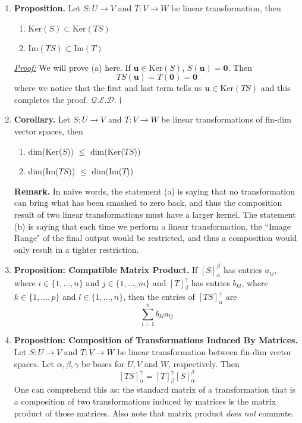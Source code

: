 \documentclass[oneside, 12pt]{book}
\newcommand{\settag}[1]{\renewcommand{\theenumi}{#1}}
\newcommand{\qed}{\hfill $\mathcal{Q}.\mathcal{E}.\mathcal{D}.\dagger$}
\newcommand{\tbf}[1]{\textbf{#1}}
\newcommand{\tit}[1]{\textit{#1}}
\newcommand{\proof}{\tit{\underline{Proof:}}} %
\newcommand{\trans}[3]{$#1:#2\rightarrow{}#3$}
\newcommand{\para}[1]{\item \tbf{#1}}
\newcommand{\vu}{\mathbf{u}}
\begin{document}
\begin{enumerate}
    \settag{2.5.6}
    \para{Proposition.} Let \trans{S}{U}{V} and \trans{T}{V}{W} be linear transformation, then
    \begin{enumerate}
        \item $\text{Ker}(S)\subset \text{Ker}(TS)$
        \item $\text{Im}(TS)\subset \text{Im}(T)$
    \end{enumerate}
    \proof \newline
    We will prove (a) here. If $\vu \in \text{Ker}(S)$, $S(\vu) = \mathbf{0}$. Then 
    \begin{equation*}
        TS(\vu) = T(\mathbf{0}) = \mathbf{0}
    \end{equation*}
    where we notice that the first and last term tells us $\vu \in \text{Ker}(TS)$ and this completes the proof. \qed
    
    \settag{2.5.7}
    \para{Corollary.} Let \trans{S}{U}{V} and \trans{T}{V}{W} be linear transformations of fin-dim vector spaces, then
    \begin{enumerate}
        \item dim(Ker($S$)) $\leq$ dim(Ker($TS$))
        \item dim(Im($TS$)) $\leq$ dim(Im($T$))
    \end{enumerate}
    \tbf{Remark.} In naive words, the statement (a) is saying that no transformation can bring what has been smashed to zero back, and thus the composition result of two linear transformations must have a larger kernel. The statement (b) is saying that each time we perform a linear transformation, the ``Image Range" of the final output would be restricted, and thus a composition would only result in a tighter restriction.
    
    \settag{2.5.9}
    \para{Proposition: Compatible Matrix Product.} If $\left[S\right]_\alpha^\beta$ has entries $a_{ij}$, where $i\in \{1, \ldots, n\}$ and $j\in \{1, \ldots, m\}$ and $\left[T\right]_\beta^\gamma$ has entries $b_{kl}$, where $k\in \{1, \ldots, p\}$ and $l\in \{1, \ldots, n\}$, then the entries of $\left[TS\right]_\alpha^\gamma$ are 
    \begin{equation*}
        \sum_{l=1}^nb_{kl}a_{lj}
    \end{equation*}
    
    \settag{2.5.13}
    \para{Proposition: Composition of Transformations Induced By Matrices.} Let \trans{S}{U}{V} and \trans{T}{V}{W} be linear transformation between fin-dim vector spaces. Let $\alpha, \beta, \gamma$ be bases for $U, V$ and $W$, respectively. Then
    \begin{equation*}
        \left[TS\right]_\alpha^\gamma = \left[T\right]_\beta^\gamma \left[S\right]_\alpha^\beta
    \end{equation*}
    One can comprehend this as: the standard matrix of a transformation that is a composition of two transformations induced by matrices is the matrix product of those matrices. Also note that matrix product \tit{does not} commute.
    

\end{enumerate}
\end{document}
